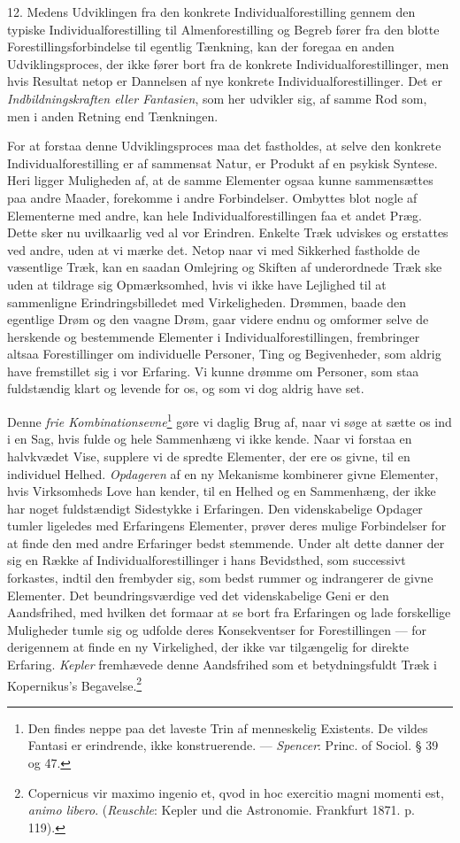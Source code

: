 \documentclass[12pt,a4paper,openany]{book}
\newcommand{\opage}[1]{\marginnote{\footnotesize\textit{[#1]}}}
\begin{document}
12. Medens Udviklingen fra den konkrete Individualforestilling gennem
den typiske Individualforestilling til Almenforestilling og Begreb fører
fra den blotte Forestillingsforbindelse til egentlig Tænkning, kan der
foregaa en anden Udviklingsproces, der ikke fører bort fra de konkrete
Individualforestillinger, men hvis Resultat netop er Dannelsen af nye
konkrete Individualforestillinger. Det er \emph{Indbildningskraften
eller Fantasien}, som her udvikler sig, af samme Rod som, men i anden
Retning end Tænkningen.

For at forstaa denne Udviklingsproces maa det fastholdes, at selve den
konkrete Individualforestilling er af sammensat Natur, er Produkt af en
psykisk Syntese. Heri ligger Muligheden af, at de samme Elementer ogsaa
kunne sammensættes paa andre Maader, forekomme i andre Forbindelser.
Ombyttes blot nogle af Elementerne med andre, kan hele
Individualforestillingen faa et andet Præg. Dette sker nu uvilkaarlig
ved al vor Erindren. Enkelte Træk udviskes og erstattes ved andre, uden
at vi mærke det. Netop naar vi med Sikkerhed fastholde de væsentlige
Træk, kan en saadan Omlejring og Skiften af underordnede Træk ske uden
at tildrage sig Opmærksomhed, hvis vi ikke have Lejlighed til at
sammenligne Erindringsbilledet med Virkeligheden. Drømmen, baade den
egentlige Drøm og den vaagne Drøm, gaar videre endnu og omformer selve
de herskende og bestemmende Elementer i Individualforestillingen,
frembringer altsaa Forestillinger om
\opage{222}individuelle Personer, Ting og Begivenheder, som aldrig have
fremstillet sig i vor Erfaring. Vi kunne drømme om Personer, som staa
fuldstændig klart og levende for os, og som vi dog aldrig have set.

Denne \emph{frie Kombinationsevne}\footnote[1]{Den findes neppe paa det
laveste Trin af menneskelig Existents. De vildes Fantasi er erindrende,
ikke konstruerende. --- \emph{Spencer}: Princ. of Sociol. § 39 og 47.}
gøre vi daglig Brug af, naar vi søge at sætte os ind i en Sag, hvis
fulde og hele Sammenhæng vi ikke kende. Naar vi forstaa en halvkvædet
Vise, supplere vi de spredte Elementer, der ere os givne, til en
individuel Helhed. \emph{Opdageren} af en ny Mekanisme kombinerer givne
Elementer, hvis Virksomheds Love han kender, til en Helhed og en
Sammenhæng, der ikke har noget fuldstændigt Sidestykke i Erfaringen. Den
videnskabelige Opdager tumler ligeledes med Erfaringens Elementer,
prøver deres mulige Forbindelser for at finde den med andre Erfaringer
bedst stemmende. Under alt dette danner der sig en Række af
Individualforestillinger i hans Bevidsthed, som successivt forkastes,
indtil den frembyder sig, som bedst rummer og indrangerer de givne
Elementer. Det beundringsværdige ved det videnskabelige Geni er den
Aandsfrihed, med hvilken det formaar at se bort fra Erfaringen og lade
forskellige Muligheder tumle sig og udfolde deres Konsekventser for
Forestillingen --- for derigennem at finde en ny Virkelighed, der ikke
var tilgængelig for direkte Erfaring. \emph{Kepler} fremhævede denne
Aandsfrihed som et betydningsfuldt Træk i Kopernikus’s
Begavelse.\footnote[2]{Copernicus vir maximo ingenio et, qvod in hoc
exercitio magni momenti est, \emph{animo libero}. (\emph{Reuschle}:
Kepler und die Astronomie. Frankfurt 1871. p. 119).}
\end{document}
